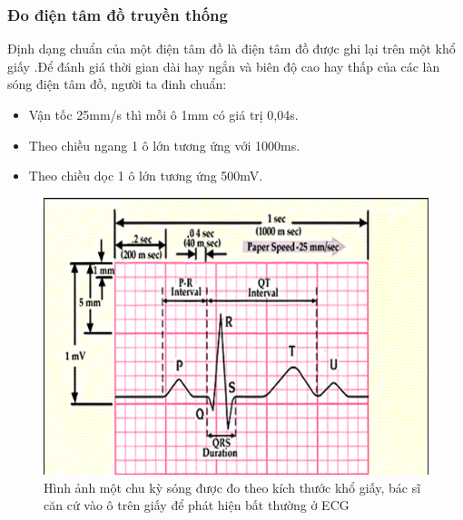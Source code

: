 \subsubsection{Đo điện tâm đồ truyền thống}
Định dạng chuẩn của một điện tâm đồ là điện tâm đồ được ghi lại trên một khổ giấy
.Để đánh giá thời gian dài hay ngắn và biên độ cao hay thấp của các làn sóng điện tâm đồ, người ta đinh chuẩn: 
\begin{itemize}
    \item Vận tốc 25mm/s thì mỗi ô 1mm có giá trị 0,04s.
    \item Theo chiều ngang 1 ô lớn tương ứng với 1000ms.
    \item Theo chiều dọc 1 ô lớn tương ứng 500mV.
\end{itemize}
\begin{center}
    \begin{figure}[htp]
    \begin{center}
    \includegraphics[scale=.6]{image/week1/new_ecg_paper.png}
    \end{center}
    \caption{Hình ảnh một chu kỳ sóng được đo theo kích thước khổ giấy, bác sĩ căn cứ vào ô trên giấy để phát hiện bất thường ở ECG \cite{ecggiay}}
    \end{figure}
\end{center}
